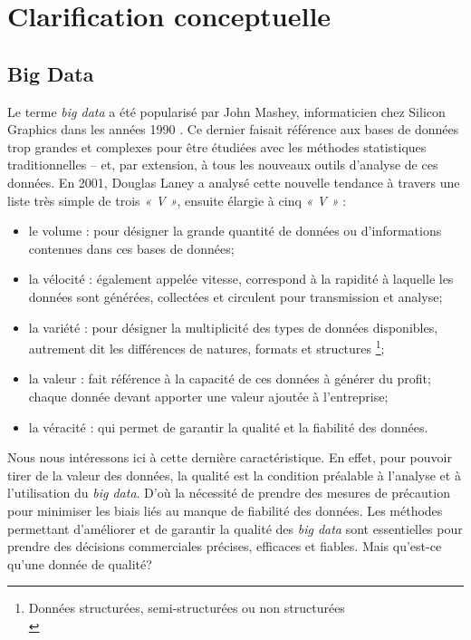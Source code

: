 \section{Clarification conceptuelle}

\subsection{Big Data}
Le terme \textit{big data} a été popularisé par John Mashey, informaticien chez Silicon Graphics dans les années 1990 \cite{Cairn_5V}. Ce dernier faisait r\'ef\'erence aux bases de données trop grandes et complexes pour être étudiées avec les méthodes statistiques traditionnelles – et, par extension, à tous les nouveaux outils d’analyse de ces données. En 2001, Douglas Laney a analysé cette nouvelle tendance à travers une liste très simple de trois \textit{« V »}, ensuite élargie à cinq \textit{« V »} \cite{Cairn_5V} \cite{Talend_5V} :
\begin{itemize}[parsep=0cm,itemsep=0cm]
\item le volume : pour d\'esigner la grande quantit\'e de donn\'ees ou d'informations contenues dans ces bases de donn\'ees;
\item la v\'elocit\'e : \'egalement appel\'ee vitesse, correspond à la rapidité à laquelle les donn\'ees sont générées, collect\'ees et circulent pour transmission et analyse;
\item la vari\'et\'e : pour désigner la multiplicité des types de données disponibles, autrement dit les différences de natures, formats et structures \footnote{Donn\'ees structur\'ees, semi-structur\'ees ou non structur\'ees\\};
\item la valeur :  fait r\'ef\'erence \`a la capacit\'e de ces donn\'ees \`a g\'en\'erer du profit; chaque donnée devant apporter une valeur ajoutée à l’entreprise; 
\item la v\'eracit\'e : qui permet de garantir la qualité et la fiabilité des données.
\end{itemize}

Nous nous intéressons ici à cette dernière caract\'eristique. En effet, pour pouvoir tirer de la valeur des donn\'ees, la qualit\'e est la condition pr\'ealable à l'analyse et à l'utilisation du \textit{big data}. D’où la nécessité de prendre des mesures de précaution pour minimiser les biais liés au manque de fiabilité des données. Les méthodes permettant d'améliorer et de garantir la qualité des \textit{big data} sont essentielles pour prendre des décisions commerciales précises, efficaces et fiables. Mais qu'est-ce qu'une donn\'ee de qualit\'e?

